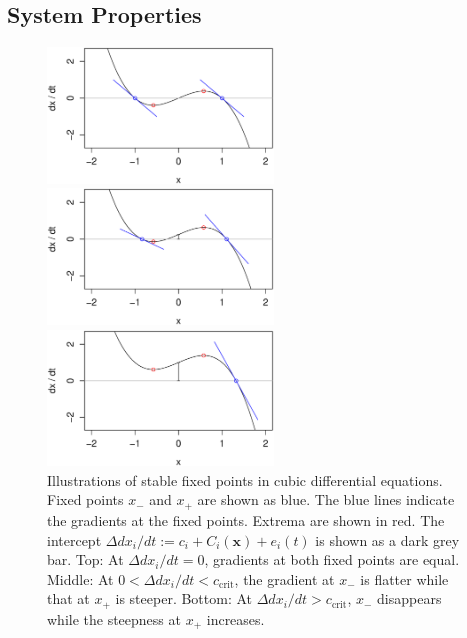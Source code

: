 \documentclass[conference]{IEEEtran}
\newcommand{\vectorsym}[1]{\ensuremath{\mathbf{#1}}}
\newcommand{\ccrit}{\ensuremath{c_{\mathrm{crit}}}}
\newcommand{\agentimpact}{\ensuremath{e}}
\newcommand{\couplingfunction}{\ensuremath{C}}
\begin{document}
\subsection{System Properties}

\begin{figure}

  \centerline{\includegraphics[width=6cm]{cubicdemo_intercept000.eps}}

  \centerline{\includegraphics[width=6cm]{cubicdemo_intercept025.eps}}

  \centerline{\includegraphics[width=6cm]{cubicdemo_intercept100.eps}}

  \caption{Illustrations of stable fixed points in cubic differential
    equations. Fixed points $x_{-}$ and $x_{+}$ are shown as blue. The
    blue lines indicate the gradients at the fixed points. Extrema are
    shown in red. The intercept
    $\Delta dx_i / dt := c_i + \couplingfunction_i(\vectorsym{x}) + \agentimpact_i(t)$ is
    shown as a dark grey bar. Top: At $\Delta dx_i / dt = 0$,
    gradients at both fixed points are equal. Middle: At
    $0 < \Delta dx_i / dt < \ccrit$, the gradient at $x_{-}$ is flatter
    while that at $x_{+}$ is steeper. Bottom: At
    $\Delta dx_i / dt > \ccrit$, $x_{-}$ disappears while the steepness
    at $x_{+}$ increases.}
  \label{fig_cubicdemo}

\end{figure}
\end{document}
